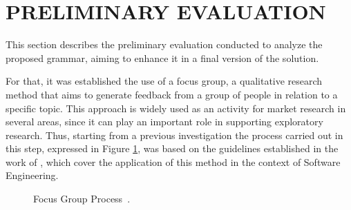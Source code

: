 \documentclass[a4paper,twoside,anonymous]{article}
\begin{document}
\section{\uppercase{Preliminary Evaluation}}
\label{sec:Evaluation}

This section describes the preliminary evaluation conducted to analyze the proposed grammar, aiming to enhance it in a final version of the solution.

For that, it was established the use of a focus group, a qualitative research method that aims to generate feedback from a group of people in relation to a specific topic.
This approach is widely used as an activity for market research in several areas, since it can play an important role in supporting exploratory research.
Thus, starting from a previous investigation \cite{edmunds:2000,frisina:2006,tong:2007} the process carried out in this step, expressed in Figure \ref{fig:focusGroup}, was based on the guidelines established in the work of \cite{Kontio:2008}, which cover the application of this method in the context of Software Engineering.


\begin{figure}[!htb]
    \centering
    
    \caption{Focus Group Process~\cite{Kontio:2008}.}
    \label{fig:focusGroup}
\end{figure}
\end{document}
